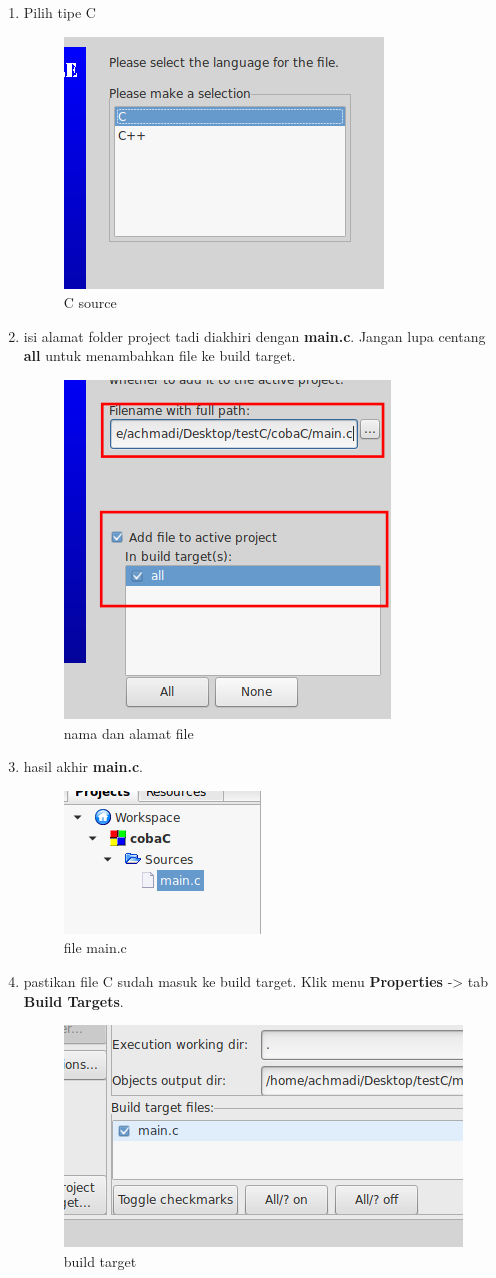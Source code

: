 \documentclass[12pt,]{article}
\begin{document}
\begin{enumerate}
		\item Pilih tipe C
		\begin{figure}[H]
			\centering
			\includegraphics[width=0.35\linewidth]{images/c_cb_6}
			\caption{C source}
		\end{figure}
		\item isi alamat folder project tadi diakhiri dengan \textbf{main.c}.
		Jangan lupa centang \textbf{all} untuk menambahkan file ke build target.
		\begin{figure}[H]
			\centering
			\includegraphics[width=0.35\linewidth]{images/c_cb_7}
			\caption{nama dan alamat file}
		\end{figure}
	    
		\item hasil akhir \textbf{main.c}.
		\begin{figure}[H]
			\centering
			\includegraphics[width=0.35\linewidth]{images/c_cb_8}
			\caption{file main.c}
		\end{figure}
	
		\item pastikan file C sudah masuk ke build target.
		Klik menu \textbf{Properties} -> tab \textbf{Build Targets}.
		\begin{figure}[H]
			\centering
			\includegraphics[width=0.35\linewidth]{images/c_cb_9}
			\caption{build target}
		\end{figure}
	

\end{enumerate}
\end{document}
